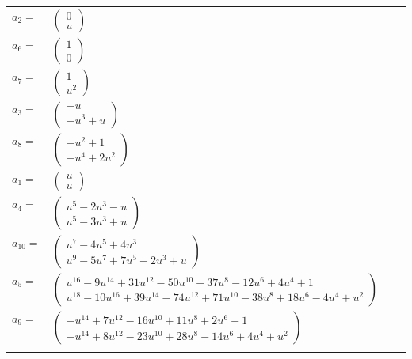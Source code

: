 \documentclass[1p]{elsarticle_modified}
\theoremstyle{definition}
\begin{document}
\begin{tabular}{m{7pt} m{180pt} m{7pt} m{180pt} }
\flushright $a_{2}=$&$\begin{pmatrix}0\\u\end{pmatrix}$ \\
\flushright $a_{6}=$&$\begin{pmatrix}1\\0\end{pmatrix}$ \\
\flushright $a_{7}=$&$\begin{pmatrix}1\\u^2\end{pmatrix}$ \\
\flushright $a_{3}=$&$\begin{pmatrix}- u\\- u^3+u\end{pmatrix}$ \\
\flushright $a_{8}=$&$\begin{pmatrix}- u^2+1\\- u^4+2 u^2\end{pmatrix}$ \\
\flushright $a_{1}=$&$\begin{pmatrix}u\\u\end{pmatrix}$ \\
\flushright $a_{4}=$&$\begin{pmatrix}u^5-2 u^3- u\\u^5-3 u^3+u\end{pmatrix}$ \\
\flushright $a_{10}=$&$\begin{pmatrix}u^7-4 u^5+4 u^3\\u^9-5 u^7+7 u^5-2 u^3+u\end{pmatrix}$ \\
\flushright $a_{5}=$&$\begin{pmatrix}u^{16}-9 u^{14}+31 u^{12}-50 u^{10}+37 u^8-12 u^6+4 u^4+1\\u^{18}-10 u^{16}+39 u^{14}-74 u^{12}+71 u^{10}-38 u^8+18 u^6-4 u^4+u^2\end{pmatrix}$ \\
\flushright $a_{9}=$&$\begin{pmatrix}- u^{14}+7 u^{12}-16 u^{10}+11 u^8+2 u^6+1\\- u^{14}+8 u^{12}-23 u^{10}+28 u^8-14 u^6+4 u^4+u^2\end{pmatrix}$\\&\end{tabular}
\end{document}
